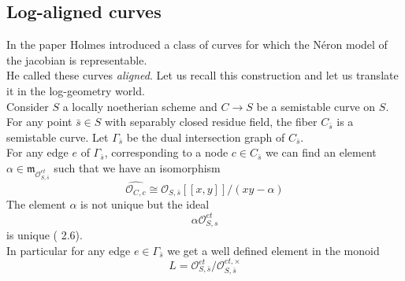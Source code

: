 \documentclass{amsart}
\theoremstyle{definition}
\numberwithin{equation}{section}
\begin{document}
\subsection{Log-aligned curves}
In the paper \cite{hol} Holmes introduced a class of curves for which the N\'eron model of the jacobian is representable.\\
He called these curves \emph{aligned}. Let us recall this construction and let us translate it in the log-geometry world.\\
Consider $S$ a locally noetherian scheme and $C{\rightarrow} S$ be a semistable curve on $S$. For any point $\bar{s}\in S$ with separably closed residue field, the fiber $C_{\bar{s}}$ is a semistable curve. Let $\Gamma_{\bar{s}}$ be the dual intersection graph of $C_{\bar{s}}$. \\
For any edge $e$ of $\Gamma_{\bar{s}}$, corresponding to a node $c\in C_{\bar{s}}$ we can find an element $\alpha\in\mathfrak{m}_{{\mathcal{O}}_{S,\bar{s}}^{et}}$ such that we have an isomorphism
$$
\widehat{{\mathcal{O}}_{C,c}}\cong \widehat{{\mathcal{O}}_{S,\bar{s}}}[[x,y]]/(xy-\alpha)
$$
\noindent The element $\alpha$ is not unique but the ideal
$$
\alpha{\mathcal{O}}_{S,s}^{et}
$$
\noindent is unique (\cite{hol} 2.6). \\
In particular for any edge $e\in \Gamma_{\bar{s}}$ we get a well defined element in the monoid 
$$
L={\mathcal{O}}_{S,\bar{s}}^{et}/{\mathcal{O}}_{S,\bar{s}}^{et,\times}
$$
\end{document}
